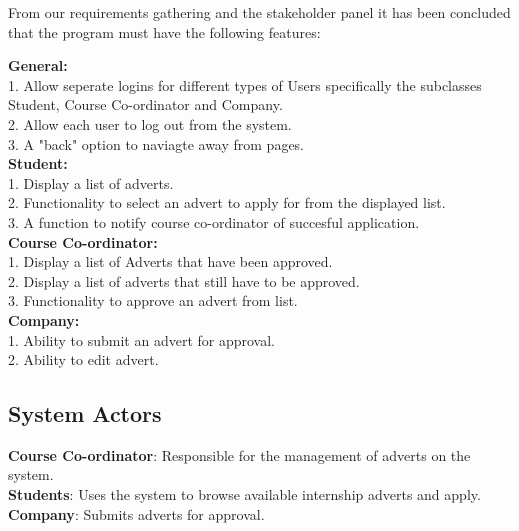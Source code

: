 \documentclass{l3deliverable}
\begin{document}
From our requirements gathering and the stakeholder panel it has been
concluded that the program must have the following features:

\textbf{General:}\\

1. Allow seperate logins for different types of Users specifically the subclasses Student, Course Co-ordinator and Company.\\
2. Allow each user to log out from the system. \\
3. A "back" option to naviagte away from pages.\\

\textbf{Student:}\\

1. Display a list of adverts.\\
2. Functionality to select an advert to apply for from the displayed list.\\
3. A function to notify course co-ordinator of succesful application.\\

\textbf{Course Co-ordinator:}\\

1. Display a list of Adverts that have been approved.\\
2. Display a list of adverts that still have to be approved.\\
3. Functionality to approve an advert from list.\\
 
\textbf{Company:}\\

1. Ability to submit an advert for approval.\\
2. Ability to edit advert.\\


\subsection{System Actors}
\textbf{Course Co-ordinator}: Responsible for the management of adverts on the system.\\
\textbf{Students}: Uses the system to browse available internship adverts and apply.\\
\textbf{Company}: Submits adverts for approval.\\

\end{document}
